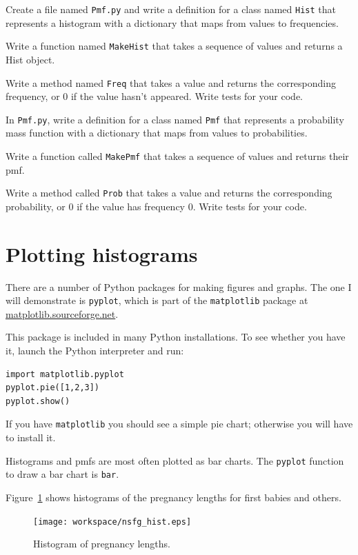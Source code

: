 \documentclass[12pt]{book}
\begin{document}
\begin{ex}
Create a file named {\tt Pmf.py} and write a definition for a class
named {\tt Hist} that represents a histogram with a dictionary
that maps from values to frequencies.

Write a function named {\tt MakeHist} that takes a sequence of
values and returns a Hist object.

Write a method named {\tt Freq} that takes a value and returns
the corresponding frequency, or 0
if the value hasn't appeared.  Write tests for your code.
\end{ex}


\begin{ex}
In {\tt Pmf.py}, write a definition for a class named {\tt Pmf} that
represents a probability mass function with a dictionary that maps
from values to probabilities.

Write a function called {\tt MakePmf} that takes a sequence of
values and returns their pmf.

Write a method called {\tt Prob} that
takes a value and returns the corresponding probability, or 0
if the value has frequency 0.  Write tests for your code.
\end{ex}


\section{Plotting histograms}

There are a number of Python packages for making figures and graphs.
The one I will demonstrate is {\tt pyplot}, which is part of
the {\tt matplotlib} package at \url{matplotlib.sourceforge.net}.

This package is included in many Python installations.  To see whether
you have it, launch the Python interpreter and run:

\begin{verbatim}
import matplotlib.pyplot
pyplot.pie([1,2,3])
pyplot.show()
\end{verbatim}

If you have {\tt matplotlib} you should see a simple pie chart;
otherwise you will have to install it.

Histograms and pmfs are most often plotted as bar charts.  The
{\tt pyplot} function to draw a bar chart is {\tt bar}.

Figure~\ref{nsfg_hist} shows histograms of the pregnancy lengths for
first babies and others.

\begin{figure}
\centerline{\texttt{[image: workspace/nsfg\_hist.eps]}}
\caption{Histogram of pregnancy lengths.}
\label{nsfg_hist}
\end{figure}
\end{document}
